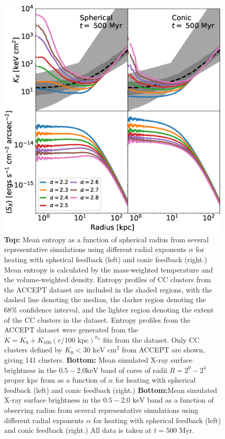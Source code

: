 \documentclass[iop,apjl, twocolappendix]{emulateapj}   %
\def\FG#1{{\textcolor{ForestGreen}{\textbf{\textit{ FG: #1}}}}}
\begin{document}
\begin{figure}
	\begin{center}
		\includegraphics[width=1\linewidth]{figures/allVradius.eps}
	\end{center}
	\caption{
    \label{fig:allVradius}
    \textbf{Top:} Mean entropy as a function of spherical radius from
    several representative simulations using different radial exponents
    $\alpha$ for heating with spherical feedback (left) and conic feedback
    (right.) Mean entropy is calculated by the mass-weighted temperature and the
    volume-weighted density. Entropy profiles
    of CC clusters from the ACCEPT dataset are included in the shaded regions,
    with the dashed line denoting the median, the darker region denoting the
    $68\%$ confidence interval, and the lighter region denoting the extent of
    the CC clusters in the dataset. Entropy profiles from the ACCEPT dataset
    were generated from the $K = K_0 + K_{100} \left ( r/100 \text{ kpc}
    \right )^{\alpha_k}$ fits from the dataset. Only CC clusters defined by $K_0
    < 30 \text{ keV cm}^2$ from ACCEPT are shown, giving 141 clusters.
    \textbf{Bottom:}	Mean simulated X-ray surface brightness in the $0.5 - 2.0
    \text{keV}$ band of cores of radii $R = 2^0 - 2^4$ proper kpc from as a
    function of $\alpha$ for heating with spherical feedback (left) and conic
    feedback (right.) 
    \textbf{Bottom:}Mean simulated X-ray surface brightness in the $0.5 -2.0
    \text{ keV}$ band as a function of observing radius from several
    representative simulations using different radial exponents $\alpha$ for
    heating with spherical feedback (left) and conic feedback (right.) All data
    is taken at $t= 500 \text{ Myr}$.
  }
\end{figure}
\end{document}
